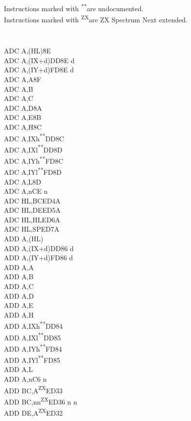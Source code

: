 \documentclass[twoside,openright,a4paper]{book}
\newcommand{\UNDOC}{\textnormal{\textsuperscript{**}}}
\newcommand{\ZXN}{\textnormal{\textsuperscript{ZX}}}
\begin{document}
Instructions marked with \UNDOC are undocumented.\\
Instructions marked with \ZXN are ZX Spectrum Next extended.
\setlength\columnsep{2em}
\begin{multicols}{3}
{
	\tt 
	\small
	\begin{tabbing}
	ADC A,(HL){\qquad}{\qquad}\=8E\\
	ADC A,(IX+d)\>DD8E d\\
	ADC A,(IY+d)\>FD8E d\\
	ADC A,A\>8F\\
	ADC A,B\\
	ADC A,C\\
	ADC A,D\>8A\\
	ADC A,E\>8B\\
	ADC A,H\>8C\\
	ADC A,IXh\UNDOC\>DD8C\\
	ADC A,IXl\UNDOC\>DD8D\\
	ADC A,IYh\UNDOC\>FD8C\\
	ADC A,IYl\UNDOC\>FD8D\\
	ADC A,L\>8D\\
	ADC A,n\>CE n\\
	ADC HL,BC\>ED4A\\
	ADC HL,DE\>ED5A\\
	ADC HL,HL\>ED6A\\
	ADC HL,SP\>ED7A\\
	ADD A,(HL)\\
	ADD A,(IX+d)\>DD86 d\\
	ADD A,(IY+d)\>FD86 d\\
	ADD A,A\\
	ADD A,B\\
	ADD A,C\\
	ADD A,D\\
	ADD A,E\\
	ADD A,H\\
	ADD A,IXh\UNDOC\>DD84\\
	ADD A,IXl\UNDOC\>DD85\\
	ADD A,IYh\UNDOC\>FD84\\
	ADD A,IYl\UNDOC\>FD85\\
	ADD A,L\\
	ADD A,n\>C6 n\\
	ADD BC,A\ZXN\>ED33\\
	ADD BC,nn\ZXN\>ED36	n n\\
	ADD DE,A\ZXN\>ED32\\

\end{tabbing}}
\end{multicols}
\end{document}

